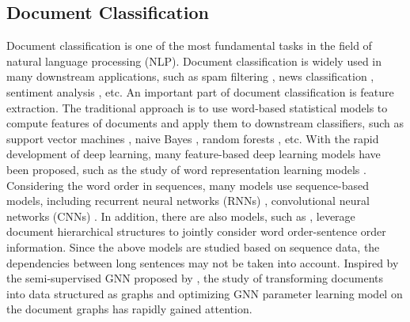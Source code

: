 \documentclass[letterpaper]{article} %
\begin{document}
\subsection{Document Classification}
Document classification is one of the most fundamental tasks in the field of natural language processing (NLP). Document classification is widely used in many downstream applications, such as spam filtering \cite{wu2020graph}, news classification \cite{liu2018early}, sentiment analysis \cite{medhat2014sentiment}, etc.
An important part of document classification is feature extraction. The traditional approach is to use word-based statistical models to compute features of documents and apply them to downstream classifiers, such as support vector machines \cite{suykens1999least}, naive Bayes \cite{mccallum1998comparison}, random forests \cite{svetnik2003random}, etc.
With the rapid development of deep learning, many feature-based deep learning models have been proposed, such as the study of word representation learning models \cite{mikolov2013distributed, grover2016node2vec}.
Considering the word order in sequences, many models use sequence-based models, including recurrent neural networks (RNNs) \cite{mikolov2010recurrent,liu2016recurrent}, convolutional neural networks (CNNs) \cite{kim-2014-convolutional}.
In addition, there are also models, such as \cite{yang2016hierarchical,8933476}, leverage document hierarchical structures to jointly consider word order-sentence order information.
Since the above models are studied based on sequence data, the dependencies between long sentences may not be taken into account.
Inspired by the semi-supervised GNN proposed by \cite{kipf2017semi}, the study of transforming documents into data structured as graphs and optimizing GNN parameter learning model on the document graphs has rapidly gained attention.
\end{document}
